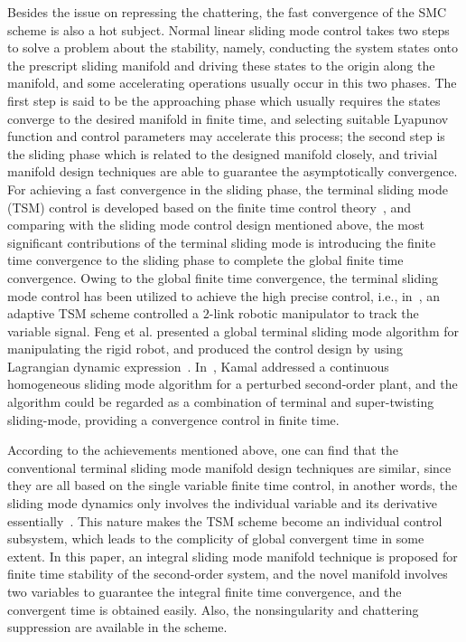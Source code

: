 \documentclass[3p]{elsarticle}
\theoremstyle{plain}
\theoremstyle{remark}
\begin{document}
Besides the issue on repressing the chattering, the fast convergence of the SMC scheme is also a hot subject. Normal linear sliding mode control takes two steps to solve a problem about the stability, namely, conducting the system states onto the prescript sliding manifold and driving these states to the origin along the manifold, and some accelerating operations usually occur in this two phases. The first step is said to be the approaching phase which usually requires the states converge to the desired manifold in finite time, and selecting suitable Lyapunov function and control parameters may accelerate this process; the second step is the sliding phase which is related to the designed manifold closely, and trivial manifold design techniques are able to guarantee the asymptotically convergence. For achieving a fast convergence in the sliding phase, the terminal sliding mode (TSM) control is developed based on the finite time control theory~\cite{haimo1986finite,bhat1997finite}, and comparing with the sliding mode control design mentioned above, the most significant contributions of the terminal sliding mode is introducing the finite time convergence to the sliding phase to complete the global finite time convergence. Owing to the global finite time convergence, the terminal sliding mode control has been utilized to achieve the high precise control, i.e., in~\cite{li2015robust}, an adaptive TSM scheme controlled a $2$-link robotic manipulator to track the variable signal. Feng et al. presented a global terminal sliding mode algorithm for manipulating the rigid robot, and produced the control design by using Lagrangian dynamic expression~\cite{feng2002non}. In~\cite{kamal2016continuous}, Kamal addressed a continuous homogeneous sliding mode algorithm for a perturbed second-order plant, and the algorithm could be regarded as a combination of terminal and super-twisting sliding-mode, providing a convergence control in finite time. \par
According to the achievements mentioned above, one can find that the conventional terminal sliding mode manifold design techniques are similar, since they are all based on the single variable finite time control, in another words, the sliding mode dynamics only involves the individual variable and its derivative essentially~\cite{mu2016switching}. This nature makes the TSM scheme become an individual control subsystem, which leads to the complicity of global convergent time in some extent. In this paper, an integral sliding mode manifold technique is proposed for finite time stability of the second-order system, and the novel manifold involves two variables to guarantee the integral finite time convergence, and the convergent time is obtained easily. Also, the nonsingularity and chattering suppression are available in the scheme. \par
\end{document}

